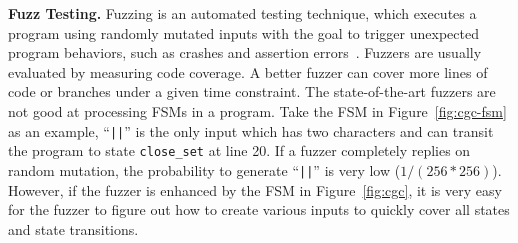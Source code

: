 \noindent\textbf{Fuzz Testing.}
Fuzzing is an automated testing technique,
which executes a program
using randomly mutated inputs
with the goal to trigger unexpected program behaviors,
such as crashes and assertion errors~\cite{afl,Angora,youwei-1}.
Fuzzers are usually evaluated by measuring code coverage.
A better fuzzer can cover more lines of code
or branches under a given time constraint.
The state-of-the-art fuzzers are not good at processing
FSMs in a program.
Take the FSM in Figure~\ref{fig:cgc-fsm} as an example,
``\verb/||/'' is the only input which has two characters and
can transit the program to state \texttt{close\_set} at line 20.
If a fuzzer completely replies on random mutation, the probability to
generate ``\verb/||/'' is very low ($1/(256 * 256)$).
However, if the fuzzer is enhanced by the
FSM in Figure~\ref{fig:cgc},
it is very easy for the fuzzer to figure out how to create various inputs to quickly cover
all states and state transitions.






